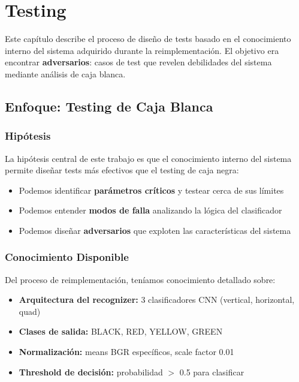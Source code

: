 \chapter{Testing}
\label{cap:diseno_tests}

Este capítulo describe el proceso de diseño de tests basado en el conocimiento interno del sistema adquirido durante la reimplementación. El objetivo era encontrar \textbf{adversarios}: casos de test que revelen debilidades del sistema mediante análisis de caja blanca.

\section{Enfoque: Testing de Caja Blanca}

\subsection{Hipótesis}

La hipótesis central de este trabajo es que el conocimiento interno del sistema permite diseñar tests más efectivos que el testing de caja negra:

\begin{itemize}
    \item Podemos identificar \textbf{parámetros críticos} y testear cerca de sus límites
    \item Podemos entender \textbf{modos de falla} analizando la lógica del clasificador
    \item Podemos diseñar \textbf{adversarios} que exploten las características del sistema
\end{itemize}

\subsection{Conocimiento Disponible}

Del proceso de reimplementación, teníamos conocimiento detallado sobre:

\begin{itemize}
    \item \textbf{Arquitectura del recognizer:} 3 clasificadores CNN (vertical, horizontal, quad)
    \item \textbf{Clases de salida:} BLACK, RED, YELLOW, GREEN
    \item \textbf{Normalización:} means BGR específicos, scale factor 0.01
    \item \textbf{Threshold de decisión:} probabilidad $>$ 0.5 para clasificar
\end{itemize}

